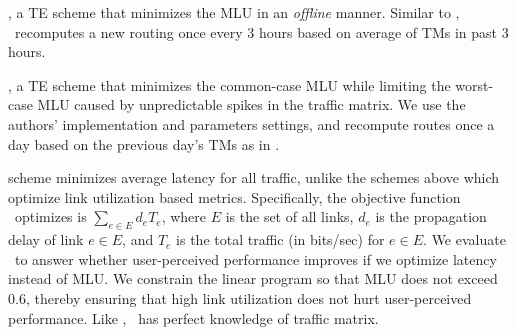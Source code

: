 {\bf{\mplsavg}}, a TE scheme that minimizes the MLU in an {\em offline} manner. Similar to \optwt, \mplsavg\ recomputes a new routing once every 3 hours based on average of TMs in past 3 hours.


{\bf{\cope}}, a TE scheme that minimizes the common-case MLU while limiting the worst-case MLU caused by unpredictable spikes in the traffic matrix. We use the authors' implementation and parameters settings, and recompute routes once a day based on the previous day's TMs  as in \cite{COPE}.


{\bf{\mindelay}} scheme minimizes average latency for all traffic, unlike the schemes above which optimize link utilization based metrics.
Specifically, the objective function \mindelay\ optimizes is $\sum_{e \in E} d_e T_e$, where $E$  is the set of all links, $d_e$ is the propagation delay of link $e \in E$, and $T_e$ is the total traffic (in bits/sec) for $e\in E$. 
We evaluate \mindelay\ to answer whether user-perceived performance improves if we optimize latency instead of MLU.
We constrain the linear program so that MLU does not exceed 0.6, thereby ensuring that high link utilization does not hurt user-perceived  performance.
Like \opt, \mindelay\ has perfect knowledge of traffic matrix.


  





